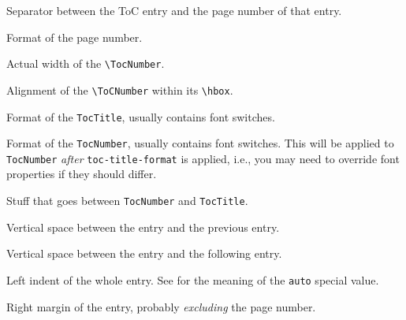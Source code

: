 
Separator between the ToC entry and the page number of that entry.


Format of the page number.



Actual width of the \lstinline{\TocNumber}.


Alignment of the \lstinline{\ToCNumber} within its
\lstinline{\hbox}.


Format of the \texttt{TocTitle}, usually contains font switches.


Format of the \texttt{TocNumber}, usually contains font switches. This
will be applied to \texttt{TocNumber} \textit{after}
\texttt{toc-title-format} is applied, i.e., you may need to override
font properties if they should differ.


Stuff that goes between \texttt{TocNumber} and \texttt{TocTitle}.


Vertical space between the entry and the previous entry.


Vertical space between the entry and the following entry.


Left indent of the whole entry. See  for the
meaning of the \texttt{auto} special value.


Right margin of the entry, probably \textit{excluding} the page number.


